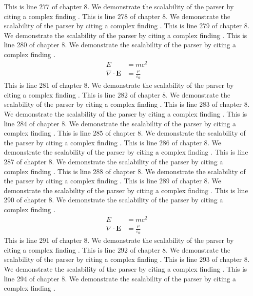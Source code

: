 This is line 277 of chapter 8. We demonstrate the scalability of the parser by citing a complex finding \cite{ref8_277}.
This is line 278 of chapter 8. We demonstrate the scalability of the parser by citing a complex finding \cite{ref8_278}.
This is line 279 of chapter 8. We demonstrate the scalability of the parser by citing a complex finding \cite{ref8_279}.
This is line 280 of chapter 8. We demonstrate the scalability of the parser by citing a complex finding \cite{ref8_280}.
\begin{align*}
  E &= mc^2 \\
  \nabla \cdot \mathbf{E} &= \frac{\rho}{\varepsilon_0}
\end{align*}
This is line 281 of chapter 8. We demonstrate the scalability of the parser by citing a complex finding \cite{ref8_281}.
This is line 282 of chapter 8. We demonstrate the scalability of the parser by citing a complex finding \cite{ref8_282}.
This is line 283 of chapter 8. We demonstrate the scalability of the parser by citing a complex finding \cite{ref8_283}.
This is line 284 of chapter 8. We demonstrate the scalability of the parser by citing a complex finding \cite{ref8_284}.
This is line 285 of chapter 8. We demonstrate the scalability of the parser by citing a complex finding \cite{ref8_285}.
This is line 286 of chapter 8. We demonstrate the scalability of the parser by citing a complex finding \cite{ref8_286}.
This is line 287 of chapter 8. We demonstrate the scalability of the parser by citing a complex finding \cite{ref8_287}.
This is line 288 of chapter 8. We demonstrate the scalability of the parser by citing a complex finding \cite{ref8_288}.
This is line 289 of chapter 8. We demonstrate the scalability of the parser by citing a complex finding \cite{ref8_289}.
This is line 290 of chapter 8. We demonstrate the scalability of the parser by citing a complex finding \cite{ref8_290}.
\begin{align*}
  E &= mc^2 \\
  \nabla \cdot \mathbf{E} &= \frac{\rho}{\varepsilon_0}
\end{align*}
This is line 291 of chapter 8. We demonstrate the scalability of the parser by citing a complex finding \cite{ref8_291}.
This is line 292 of chapter 8. We demonstrate the scalability of the parser by citing a complex finding \cite{ref8_292}.
This is line 293 of chapter 8. We demonstrate the scalability of the parser by citing a complex finding \cite{ref8_293}.
This is line 294 of chapter 8. We demonstrate the scalability of the parser by citing a complex finding \cite{ref8_294}.
